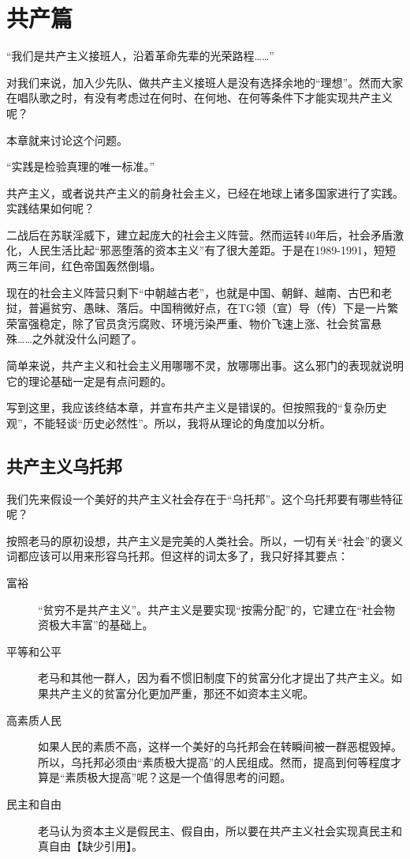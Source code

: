 \chapter{共产篇}
“我们是共产主义接班人，沿着革命先辈的光荣路程……”

对我们来说，加入少先队、做共产主义接班人是没有选择余地的“理想”。然而大家在唱队歌之时，有没有考虑过在何时、在何地、在何等条件下才能实现共产主义呢？

本章就来讨论这个问题。

\zPar

 “实践是检验真理的唯一标准。”
 
共产主义，或者说共产主义的前身社会主义，已经在地球上诸多国家进行了实践。实践结果如何呢？

二战后在苏联淫威下，建立起庞大的社会主义阵营。然而运转40年后，社会矛盾激化，人民生活比起“邪恶堕落的资本主义”有了很大差距。于是在1989-1991，短短两三年间，红色帝国轰然倒塌。

现在的社会主义阵营只剩下“中朝越古老”，也就是中国、朝鲜、越南、古巴和老挝，普遍贫穷、愚昧、落后。中国稍微好点，在TG领（宣）导（传）下是一片繁荣富强稳定，除了官员贪污腐败、环境污染严重、物价飞速上涨、社会贫富悬殊……之外就没什么问题了。

简单来说，共产主义和社会主义用哪哪不灵，放哪哪出事。这么邪门的表现就说明它的理论基础一定是有点问题的。

\zPar

写到这里，我应该终结本章，并宣布共产主义是错误的。但按照我的“复杂历史观”，不能轻谈“历史必然性”。所以，我将从理论的角度加以分析。

\section{共产主义乌托邦}

我们先来假设一个美好的共产主义社会存在于“乌托邦”。这个乌托邦要有哪些特征呢？

按照老马的原初设想，共产主义是完美的人类社会。所以，一切有关“社会”的褒义词都应该可以用来形容乌托邦。但这样的词太多了，我只好择其要点：

\begin{description}
\item[富裕] “贫穷不是共产主义”。共产主义是要实现“按需分配”的，它建立在“社会物资极大丰富”的基础上。
\item[平等和公平] 老马和其他一群人，因为看不惯旧制度下的贫富分化才提出了共产主义。如果共产主义的贫富分化更加严重，那还不如资本主义呢。
\item[高素质人民] 如果人民的素质不高，这样一个美好的乌托邦会在转瞬间被一群恶棍毁掉。所以，乌托邦必须由“素质极大提高”的人民组成。然而，提高到何等程度才算是“素质极大提高”呢？这是一个值得思考的问题。
\item[民主和自由] 老马认为资本主义是假民主、假自由，所以要在共产主义社会实现真民主和真自由【缺少引用】。
\end{description}


